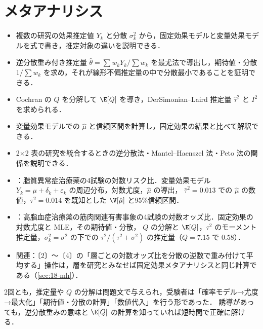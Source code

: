 \chapter{メタアナリシス}\label{ch:18}

\begin{goalbox}
\begin{itemize}
\item 複数の研究の効果推定値 $Y_k$ と分散 $\sigma_k^2$ から，固定効果モデルと変量効果モデルを式で書き，推定対象の違いを説明できる．
\item 逆分散重み付き推定量 $\hat\theta=\sum w_kY_k/\sum w_k$ を最尤法で導出し，期待値・分散 $1/\sum w_k$ を求め，それが線形不偏推定量の中で分散最小であることを証明できる．
\item Cochran の $Q$ を分解して $\E[Q]$ を導き，DerSimonian--Laird 推定量 $\hat\tau^2$ と $I^2$ を求められる．
\item 変量効果モデルでの $\hat\mu$ と信頼区間を計算し，固定効果の結果と比べて解釈できる．
\item 2×2 表の研究を統合するときの逆分散法・Mantel--Haenszel 法・Peto 法の関係を説明できる．
\end{itemize}
\end{goalbox}

\begin{exambox}
\begin{itemize}
\item {}：脂質異常症治療薬の4試験の対数リスク比．変量効果モデル $Y_k=\mu+\delta_k+\varepsilon_k$ の周辺分布，対数尤度，$\hat\mu$ の導出，
      $\hat\tau^2=0.013$ での $\hat\mu$ の数値，$\tau^2=0.014$ を既知とした $\V[\hat\mu]$ と95\%信頼区間．
\item {}：高脂血症治療薬の筋肉関連有害事象の4試験の対数オッズ比．固定効果の対数尤度と MLE，その期待値・分散，
      $Q$ の分解と $\E[Q]$，$\tau^2$ のモーメント推定量，$\sigma_k^2=\sigma^2$ の下での $\tau^2/(\tau^2+\sigma^2)$ の推定量（$Q=7.15$ で $0.58$）．
\item 関連：〔2〕〜〔4〕の「層ごとの対数オッズ比を分散の逆数で重み付けて平均する」操作は，層を研究とみなせば固定効果メタアナリシスと同じ計算である（\cref{sec:18-mh}）．
\end{itemize}
2回とも，推定量や $Q$ の分解は問題文で与えられ，受験者は「確率モデル→尤度→最大化」「期待値・分散の計算」「数値代入」を行う形であった．
誘導があっても，逆分散重みの意味と $\E[Q]$ の計算を知っていれば短時間で正確に解ける．
\end{exambox}

